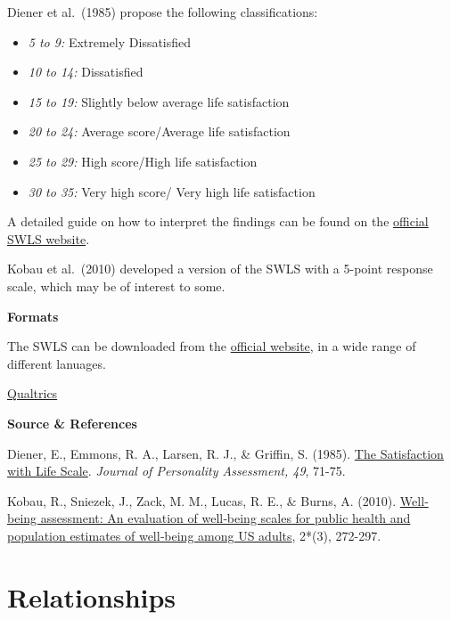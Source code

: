\documentclass[
]{book}
\providecommand{\tightlist}{%
  \setlength{\itemsep}{0pt}\setlength{\parskip}{0pt}}
\begin{document}
Diener et al.~(1985) propose the following classifications:

\begin{itemize}
\tightlist
\item
  \emph{5 to 9:} Extremely Dissatisfied
\item
  \emph{10 to 14:} Dissatisfied
\item
  \emph{15 to 19:} Slightly below average life satisfaction
\item
  \emph{20 to 24:} Average score/Average life satisfaction
\item
  \emph{25 to 29:} High score/High life satisfaction
\item
  \emph{30 to 35:} Very high score/ Very high life satisfaction
\end{itemize}

A detailed guide on how to interpret the findings can be found on the \href{http://labs.psychology.illinois.edu/~ediener/SWLS.html}{official SWLS website}.

Kobau et al.~(2010) developed a version of the SWLS with a 5-point response scale, which may be of interest to some.

\textbf{Formats}

The SWLS can be downloaded from the \href{http://labs.psychology.illinois.edu/~ediener/SWLS.html}{official website}, in a wide range of different lanuages.

\href{/questionnaires/Satisfaction_of_Life_Scale}{Qualtrics}

\textbf{Source \& References}

Diener, E., Emmons, R. A., Larsen, R. J., \& Griffin, S. (1985). \href{https://emmons.faculty.ucdavis.edu/wp-content/uploads/sites/90/2015/08/1985_5-SWLS.pdf}{The Satisfaction with Life Scale}. \emph{Journal of Personality Assessment, 49}, 71-75.

Kobau, R., Sniezek, J., Zack, M. M., Lucas, R. E., \& Burns, A. (2010). \href{https://iaap-journals.onlinelibrary.wiley.com/doi/abs/10.1111/j.1758-0854.2010.01035.x.*Applied\%20Psychology:\%20Health\%20and\%20Well-being}{Well‐being assessment: An evaluation of well‐being scales for public health and population estimates of well‐being among US adults}, 2*(3), 272-297.

\hypertarget{relationships}{%
\section{Relationships}\label{relationships}}
\end{document}
